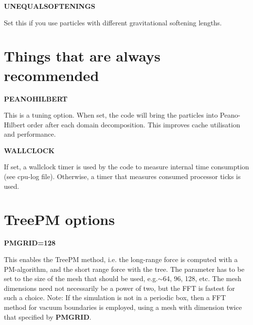 \begin{DoxyItemize}
\item {\bfseries UNEQUALSOFTENINGS} \par
 Set this if you use particles with different gravitational softening lengths.
\end{DoxyItemize}

\par
 \hypertarget{Gadget-Makefile_secmake2}{}\section{Things that are always recommended}\label{Gadget-Makefile_secmake2}

\begin{DoxyItemize}
\item {\bfseries PEANOHILBERT} \par
 This is a tuning option. When set, the code will bring the particles into Peano-\/Hilbert order after each domain decomposition. This improves cache utilisation and performance.
\end{DoxyItemize}


\begin{DoxyItemize}
\item {\bfseries WALLCLOCK} \par
 If set, a wallclock timer is used by the code to measure internal time consumption (see cpu-\/log file). Otherwise, a timer that measures consumed processor ticks is used.
\end{DoxyItemize}

\par
 \hypertarget{Gadget-Makefile_secmake3}{}\section{TreePM options}\label{Gadget-Makefile_secmake3}

\begin{DoxyItemize}
\item {\bfseries PMGRID=128} \par
 This enables the TreePM method, i.e. the long-\/range force is computed with a PM-\/algorithm, and the short range force with the tree. The parameter has to be set to the size of the mesh that should be used, e.g.$\sim$64, 96, 128, etc. The mesh dimensions need not necessarily be a power of two, but the FFT is fastest for such a choice. Note: If the simulation is not in a periodic box, then a FFT method for vacuum boundaries is employed, using a mesh with dimension twice that specified by {\bfseries PMGRID}.
\end{DoxyItemize}


